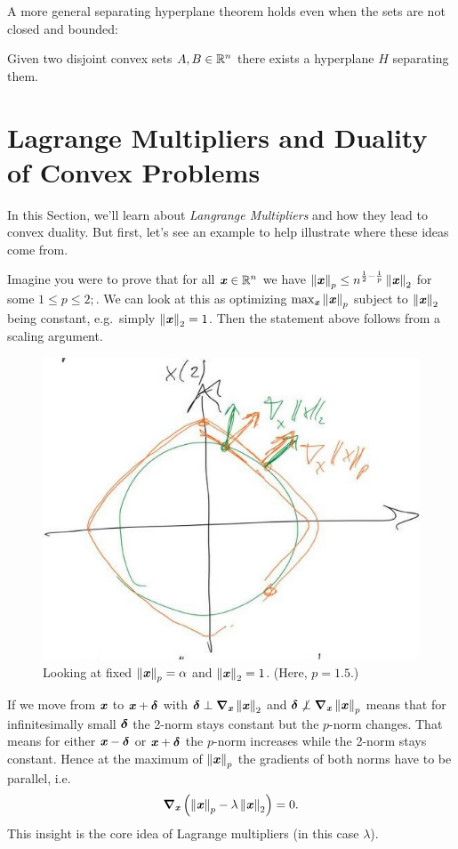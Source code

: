A more general separating hyperplane theorem holds even when the sets
are not closed and bounded:

\begin{theorem} \label{th:sht}
Given two disjoint convex sets $A, B \in \mathbb{R}^n$ there exists a hyperplane $H$
separating them.
\end{theorem}


\section{Lagrange Multipliers and Duality of Convex Problems}

In this Section, we'll learn about \emph{Langrange Multipliers} and
how they lead to convex duality.
But first, let's see an example to help illustrate where these ideas
come from.

Imagine you were to prove that for all $\boldsymbol{\mathit{x}} \in \mathbb{R}^n$ we have $\left\| \boldsymbol{\mathit{x}} \right\|_p \leq n^{\frac{1}{2} - \frac{1}{p}}\left\| \boldsymbol{\mathit{x}} \right\|_2$ for some $1 \leq p \leq 2;$.
We can look at this as optimizing $\max_{\boldsymbol{\mathit{x}}} \left\| \boldsymbol{\mathit{x}} \right\|_p$ subject to $\left\| \boldsymbol{\mathit{x}} \right\|_2$ being constant, e.g.\ simply $\left\| \boldsymbol{\mathit{x}} \right\|_2 = 1$. Then the statement above follows from a scaling argument.

\begin{figure}[ht]
  \centering
  \includegraphics[width=.48\textwidth]{fig/lec12-2p-norms.jpeg}
  \caption{Looking at fixed $\left\| \boldsymbol{\mathit{x}} \right\|_p = \alpha$ and $\left\| \boldsymbol{\mathit{x}} \right\|_2=1$. (Here, $p = 1.5$.)}
  \label{fig:2-p-norm}
\end{figure}

If we move from $\boldsymbol{\mathit{x}}$ to $\boldsymbol{\mathit{x}} + \boldsymbol{\delta}$ with $\boldsymbol{\delta} \perp \boldsymbol{\nabla}_{\boldsymbol{\mathit{x}}}\left\| \boldsymbol{\mathit{x}} \right\|_2$ and $\boldsymbol{\delta} \not\perp \boldsymbol{\nabla}_{\boldsymbol{\mathit{x}}}\left\| \boldsymbol{\mathit{x}} \right\|_p$ means that for infinitesimally small $\boldsymbol{\delta}$ the 2-norm stays constant but the $p$-norm changes.
That means for either $\boldsymbol{\mathit{x}} - \boldsymbol{\delta}$ or $\boldsymbol{\mathit{x}} + \boldsymbol{\delta}$ the $p$-norm increases
while the 2-norm stays constant. Hence at the maximum of $\left\| \boldsymbol{\mathit{x}} \right\|_p$ the gradients of both norms have to be parallel, i.e.~\begin{equation*}\boldsymbol{\nabla}_{\boldsymbol{\mathit{x}}}\left(\left\| \boldsymbol{\mathit{x}} \right\|_p - \lambda\left\| \boldsymbol{\mathit{x}} \right\|_2\right) = 0.\end{equation*}
This insight is the core idea of Lagrange multipliers (in this case $\lambda$).

